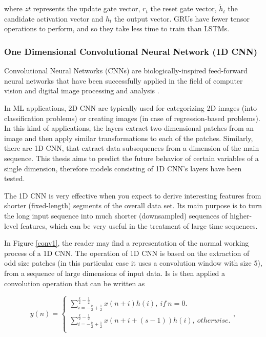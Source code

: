 where $zt$ represents the update gate vector, $r_t$ the reset gate vector, $\tilde{h}_t$ the candidate activation vector and $h_t$ the output vector. \ac{GRU}s have fewer tensor operations to perform, and so they take less time to train than \ac{LSTM}s.  

\subsubsection{One Dimensional Convolutional Neural Network (1D CNN)}\label{chap3:subsubsec:1dcnn}


Convolutional Neural Networks (\ac{CNN}s) are biologically-inspired feed-forward neural networks that have been successfully applied in the field of computer vision and digital image processing and analysis \cite{cnn0}.

In \ac{ML} applications, \ac{2D CNN} are typically used for categorizing 2D images (into classification problems) or creating images (in case of regression-based problems). In this kind of applications, the layers extract two-dimensional patches from an image and then apply similar transformations to each of the patches. Similarly, there are \ac{1D CNN}, that extract data subsequences from a dimension of the main sequence. This thesis aims to predict the future behavior of certain variables of a single dimension, therefore models consisting of \ac{1D CNN}'s layers have been tested.

The \ac{1D CNN} is very effective when you expect to derive interesting features from shorter (fixed-length) segments of the overall data set. Its main purpose is to turn the long input sequence into much shorter (downsampled) sequences of higher-level features, which can be very useful in the treatment of large time sequences.

In Figure \ref{conv1}, the reader may find a representation of the normal working process of a \ac{1D CNN}. The operation of \ac{1D CNN} is based on the extraction of odd size patches (in this particular case it uses a convolution window with size 5), from a sequence of large dimensions of input data. Is is then applied a convolution operation that can be written as \cite{cnn2} 

\begin{equation}
y(n)=
    \begin{cases} 
            
        \sum_{i=-\frac{k}{2}+\frac{1}{2}}^{\frac{k}{2}-\frac{1}{2}} x(n+i)h(i),\  if \  n=0.\\
        \sum_{i=-\frac{k}{2}+\frac{1}{2}}^{\frac{k}{2}-\frac{1}{2}} x(n+i+(s-1))h(i),\  otherwise.\\
    
    \end{cases} ,
\end{equation}

